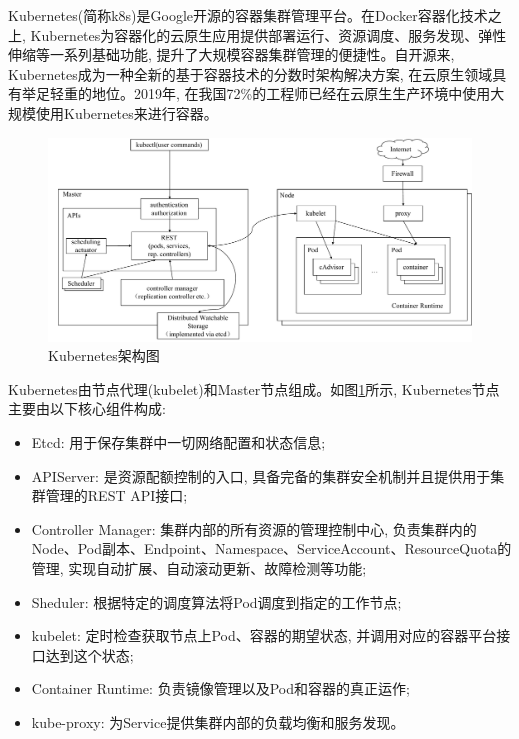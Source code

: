 Kubernetes(简称k8s)是Google开源的容器集群管理平台。在Docker容器化技术之上, Kubernetes为容器化的云原生应用提供部署运行、资源调度、服务发现、弹性伸缩等一系列基础功能, 提升了大规模容器集群管理的便捷性。自开源来, Kubernetes成为一种全新的基于容器技术的分数时架构解决方案, 在云原生领域具有举足轻重的地位。2019年, 在我国72\%的工程师已经在云原生生产环境中使用大规模使用Kubernetes来进行容器\footnotemark[1]。

\begin{figure}[h] %
    \centering %
    \includegraphics[width=1.0\textwidth]{FIGs/chapter2/k8s.pdf} %
    \caption{Kubernetes架构图} %
    \label{k8s} %
\end{figure}%

Kubernetes由节点代理(kubelet)和Master节点组成。如图\ref{k8s}所示, Kubernetes节点主要由以下核心组件构成:

\begin{itemize}[itemindent=2em]
    \item Etcd: 用于保存集群中一切网络配置和状态信息;

    \item APIServer: 是资源配额控制的入口, 具备完备的集群安全机制并且提供用于集群管理的REST API接口;

    \item Controller Manager: 集群内部的所有资源的管理控制中心, 负责集群内的Node、Pod副本、Endpoint、Namespace、ServiceAccount、ResourceQuota的管理, 实现自动扩展、自动滚动更新、故障检测等功能;

    \item Sheduler: 根据特定的调度算法将Pod调度到指定的工作节点;

    \item kubelet: 定时检查获取节点上Pod、容器的期望状态, 并调用对应的容器平台接口达到这个状态;

    \item Container Runtime: 负责镜像管理以及Pod和容器的真正运作\cite{wangjunxiang2018};

    \item kube-proxy: 为Service提供集群内部的负载均衡和服务发现。
\end{itemize}

